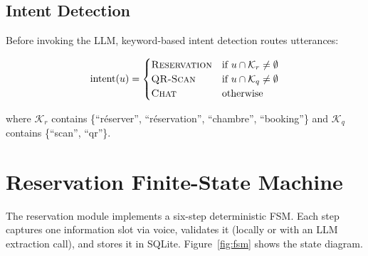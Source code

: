\documentclass[a4paper]{article}
\begin{document}
\subsection{Intent Detection}

Before invoking the LLM, keyword-based intent detection routes utterances:

\begin{equation}
  \text{intent}(u) =
  \begin{cases}
    \textsc{Reservation} & \text{if } u \cap \mathcal{K}_r \neq \emptyset \\
    \textsc{QR-Scan}     & \text{if } u \cap \mathcal{K}_q \neq \emptyset \\
    \textsc{Chat}        & \text{otherwise}
  \end{cases}
  \label{eq:intent}
\end{equation}

where $\mathcal{K}_r$ contains \{``r\'eserver'', ``r\'eservation'', ``chambre'', ``booking''\} and $\mathcal{K}_q$ contains \{``scan'', ``qr''\}.

\section{Reservation Finite-State Machine}

The reservation module implements a six-step deterministic FSM. Each step captures one information slot via voice, validates it (locally or with an LLM extraction call), and stores it in SQLite. Figure~\ref{fig:fsm} shows the state diagram.
\end{document}
